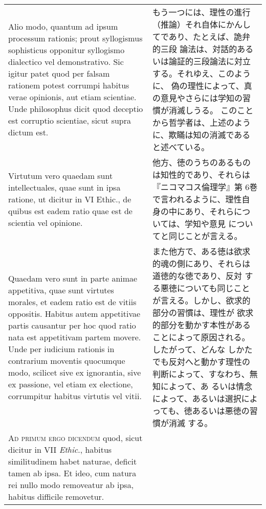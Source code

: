 \documentclass[10pt]{jsarticle} %
\begin{document}
\begin{longtable}{p{21em}p{21em}}
\\


Alio modo,
quantum ad ipsum processum rationis; prout syllogismus sophisticus
opponitur syllogismo dialectico vel demonstrativo. Sic igitur patet
quod per falsam rationem potest corrumpi habitus verae opinionis, aut
etiam scientiae. Unde philosophus dicit quod deceptio est corruptio
scientiae, sicut supra dictum est.


&

もう一つには、理性の進行（推論）それ自体にかんしてであり、たとえば、詭弁的三段
論法は、対話的あるいは論証的三段論法に対立する。それゆえ、このように、
偽の理性によって、真の意見やさらには学知の習慣が消滅しうる。
このことから哲学者は、上述のように、欺瞞は知の消滅であると述べている。

\\


Virtutum vero quaedam sunt
intellectuales, quae sunt in ipsa ratione, ut dicitur in VI Ethic., de
quibus est eadem ratio quae est de scientia vel opinione. 


&

他方、徳のうちのあるものは知性的であり、それらは『ニコマコス倫理学』第
6巻で言われるように、理性自身の中にあり、それらについては、学知や意見
についてと同じことが言える。


\\


Quaedam vero
sunt in parte animae appetitiva, quae sunt virtutes morales, et eadem
ratio est de vitiis oppositis. Habitus autem appetitivae partis
causantur per hoc quod ratio nata est appetitivam partem movere. Unde
per iudicium rationis in contrarium moventis quocumque modo, scilicet
sive ex ignorantia, sive ex passione, vel etiam ex electione,
corrumpitur habitus virtutis vel vitii.


&

また他方で、ある徳は欲求的魂の側にあり、それらは道徳的な徳であり、反対
する悪徳についても同じことが言える。しかし、欲求的部分の習慣は、理性が
欲求的部分を動かす本性があることによって原因される。したがって、どんな
しかたでも反対へと動かす理性の判断によって、すなわち、無知によって、あ
るいは情念によって、あるいは選択によっても、徳あるいは悪徳の習慣が消滅
する。


\\



{\scshape Ad primum ergo dicendum} quod, sicut dicitur in VII
{\itshape Ethic}., habitus similitudinem habet naturae, deficit tamen
ab ipsa. Et ideo, cum natura rei nullo modo removeatur ab ipsa,
habitus difficile removetur.



\end{longtable}
\end{document}
